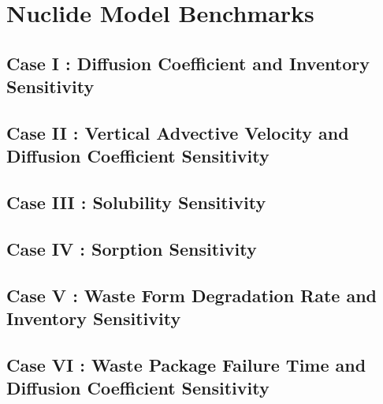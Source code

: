 \section{Nuclide Model Benchmarks}\label{sec:nuclide_benchmarks}
\subsection{Case I : Diffusion Coefficient and Inventory Sensitivity}
\subsection{Case II : Vertical Advective Velocity and Diffusion Coefficient Sensitivity}
\subsection{Case III : Solubility Sensitivity}
\subsection{Case IV : Sorption Sensitivity}
\subsection{Case V : Waste Form Degradation Rate and Inventory Sensitivity}
\subsection{Case VI : Waste Package Failure Time and Diffusion Coefficient Sensitivity}
